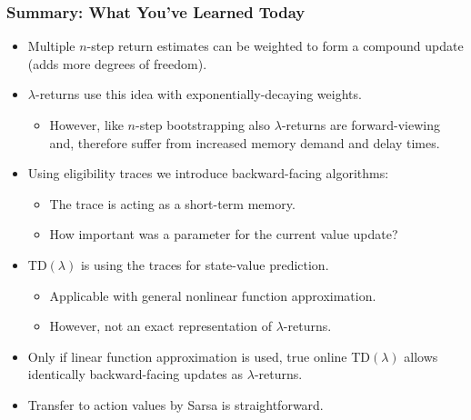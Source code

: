 \begin{frame}
\frametitle{Summary: What You've Learned Today}
\begin{itemize}
	\item Multiple $n$-step return estimates can be weighted to form a compound update (adds more degrees of freedom).\pause
	\item $\lambda$-returns use this idea with exponentially-decaying weights.
	\begin{itemize}
		\item However, like $n$-step bootstrapping also $\lambda$-returns are forward-viewing and, therefore suffer from increased memory demand and delay times.
	\end{itemize}\pause
	\item Using eligibility traces we introduce backward-facing algorithms:
		\begin{itemize}
			\item The trace is acting as a short-term memory.
			\item How important was a parameter for the current value update? 
		\end{itemize}\pause
	\item TD$(\lambda)$	is using the traces for state-value prediction.
	\begin{itemize}
		\item Applicable with general nonlinear function approximation.
		\item However, not an exact representation of $\lambda$-returns.
	\end{itemize}\pause
	\item Only if linear function approximation is used, true online TD$(\lambda)$ allows identically backward-facing updates as $\lambda$-returns. \pause
	\item Transfer to action values by Sarsa is straightforward.
\end{itemize}
\end{frame}

